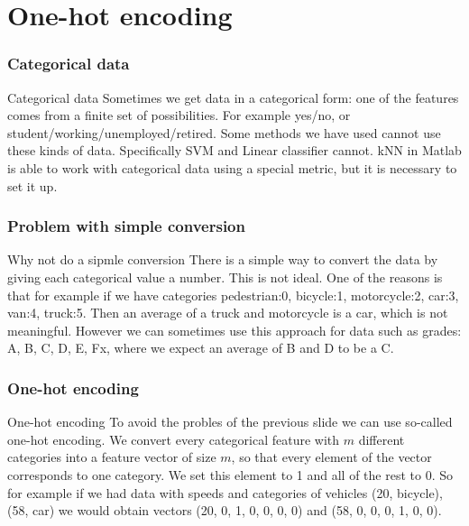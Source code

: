\documentclass{beamer}
\begin{document}
\section{One-hot encoding}

\begin{frame}
\frametitle{Categorical data}

\begin{block}{Categorical data}
Sometimes we get data in a categorical form: one of the features comes from a finite set of possibilities. For example yes/no, or student/working/unemployed/retired. Some methods we have used cannot use these kinds of data. Specifically SVM and Linear classifier cannot. kNN in Matlab is able to work with categorical data using a special metric, but it is necessary to set it up.
\end{block}
\end{frame}

\begin{frame}
\frametitle{Problem with simple conversion}

\begin{block}{Why not do a sipmle conversion}
There is a simple way to convert the data by giving each categorical value a number. This is not ideal. One of the reasons is that for example if we have categories pedestrian:0, bicycle:1, motorcycle:2, car:3, van:4, truck:5. Then an average of a truck and motorcycle is a car, which is not meaningful. However we can sometimes use this approach for data such as grades: A, B, C, D, E, Fx, where we expect an average of B and D to be a C.
\end{block}
\end{frame}

\begin{frame}
\frametitle{One-hot encoding}
\begin{block}{One-hot encoding}
To avoid the probles of the previous slide we can use so-called one-hot encoding. We convert every categorical feature with $m$ different categories into a feature vector of size $m$, so that every element of the vector corresponds to one category. We set this element to 1 and all of the rest to 0. So for example if we had data with speeds and categories of vehicles (20, bicycle), (58, car) we would obtain vectors  (20, 0, 1, 0, 0, 0, 0) and (58, 0, 0, 0, 1, 0, 0).
\end{block}
\end{frame}
\end{document}
